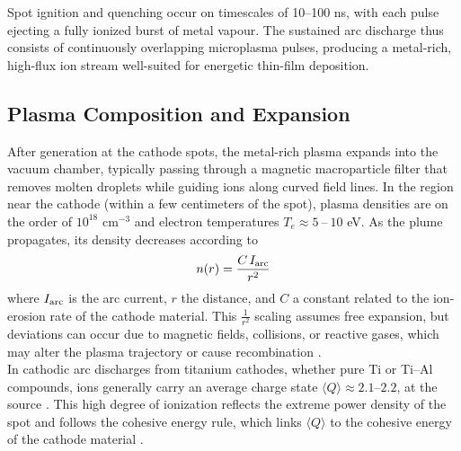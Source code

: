 Spot ignition and quenching occur on timescales of 10–100 ns, with each pulse ejecting a fully ionized burst of metal vapour. The sustained arc discharge thus consists of continuously overlapping microplasma pulses, producing a metal-rich, high-flux ion stream well-suited for energetic thin-film deposition.\\


\subsection{Plasma Composition and Expansion}

After generation at the cathode spots, the metal-rich plasma expands into the vacuum chamber, typically passing through a magnetic macroparticle filter that removes molten droplets while guiding ions along curved field lines. In the region near the cathode (within a few centimeters of the spot), plasma densities are on the order of \(10^{18}\) cm$^{-3}$ and electron temperatures \(T_e\approx5\ \text{–}\ 10\) eV. As the plume propagates, its density decreases according to
\begin{equation}
    n(r) = \frac{C\,I_{\rm arc}}{r^2}
\end{equation}
where \(I_{\rm arc}\) is the arc current, $r$ the distance, and $C$ a constant related to the ion‐erosion rate of the cathode material. This $\frac{1}{r^2}$ scaling assumes free expansion, but deviations can occur due to magnetic fields, collisions, or reactive gases, which may alter the plasma trajectory or cause recombination \cite[Chap.~4.3; Eq.~4.3, p.~178]{cathodic_arcs}.\\

In cathodic arc discharges from titanium cathodes, whether pure Ti or Ti–Al compounds, ions generally carry an average charge state \(\langle Q\rangle\approx2.1\text{–}2.2\), at the source \cite[Chap.~4.1; App.~B.8]{cathodic_arcs}. This high degree of ionization reflects the extreme power density of the spot and follows the cohesive energy rule, which links \(\langle Q\rangle\) to the cohesive energy of the cathode material \cite[App.~B.8]{cathodic_arcs}.



